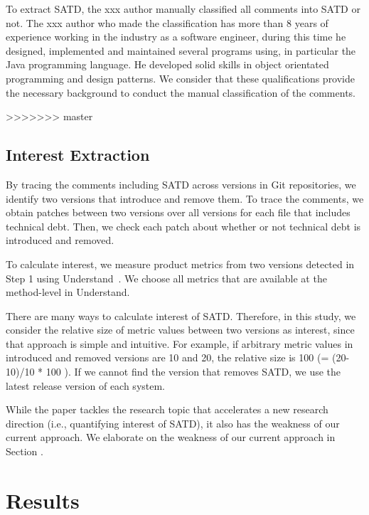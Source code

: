 \documentclass[conference]{IEEEtran}
\begin{document}
To extract SATD, the xxx author manually classified all comments into SATD or not.
The xxx author who made the classification has more than 8 years of experience working in the industry as a software engineer, during this time he designed, implemented and maintained several programs using, in particular the Java programming language. He developed solid skills in object orientated programming and design patterns. We consider that these qualifications provide the necessary background to conduct the manual classification of the comments.

>>>>>>> master
\subsection{Interest Extraction} \label{subsec:interest}

By tracing the comments including SATD across versions in Git repositories, we identify two versions that introduce and remove them. To trace the comments, we obtain patches between two versions over all versions for each file that includes technical debt. Then, we check each patch about whether or not technical debt is introduced and removed. 

To calculate interest, we measure product metrics from two versions detected in Step 1 using {\sc Understand}~\cite{Understand}. We choose all metrics that are available at the method-level in {\sc Understand}.

There are many ways to calculate interest of SATD. Therefore, in this study, we consider the relative size of metric values between two versions as interest, since that approach is simple and intuitive. For example, if arbitrary metric values in introduced and removed versions are 10 and 20, the relative size is 100 (= (20-10)/10 * 100 ).
If we cannot find the version that removes SATD, 
we use the latest release version of each system. 

While the paper tackles the research topic that accelerates a new research direction (i.e., quantifying interest of SATD), it also has the weakness of our current approach. We elaborate on the weakness of our current approach in Section .

\section{Results}
\end{document}
